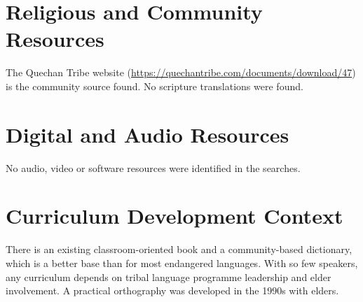 \documentclass[12pt]{article}
\begin{document}
\section{Religious and Community Resources}
The Quechan Tribe website (\url{https://quechantribe.com/documents/download/47}) is the community source found. No scripture translations were found.

\section{Digital and Audio Resources}
No audio, video or software resources were identified in the searches.

\section{Curriculum Development Context}
There is an existing classroom-oriented book and a community-based dictionary, which is a better base than for most endangered languages. With so few speakers, any curriculum depends on tribal language programme leadership and elder involvement. A practical orthography was developed in the 1990s with elders.
\end{document}
